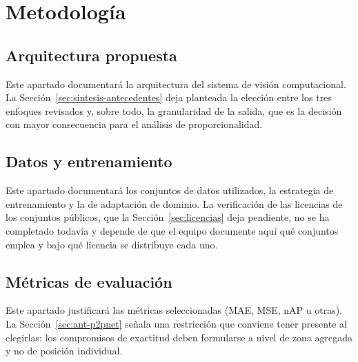 %
%
\section{Metodología}
\label{sec:metodologia}


\subsection{Arquitectura propuesta}
\label{sec:arquitectura}

Este apartado documentará la arquitectura del sistema de visión
computacional. La Sección~\ref{sec:sintesis-antecedentes} deja planteada
la elección entre los tres enfoques revisados y, sobre todo, la
granularidad de la salida, que es la decisión con mayor consecuencia para
el análisis de proporcionalidad.

\subsection{Datos y entrenamiento}
\label{sec:datos-entrenamiento}

Este apartado documentará los conjuntos de datos utilizados, la
estrategia de entrenamiento y la de adaptación de dominio. La
verificación de las licencias de los conjuntos públicos, que la
Sección~\ref{sec:licencias} deja pendiente, no se ha completado todavía
y depende de que el equipo documente aquí qué conjuntos emplea y bajo qué
licencia se distribuye cada uno.

\subsection{Métricas de evaluación}
\label{sec:metricas}

Este apartado justificará las métricas seleccionadas (MAE, MSE, nAP u
otras). La Sección~\ref{sec:ant-p2pnet} señala una restricción que
conviene tener presente al elegirlas: los compromisos de exactitud deben
formularse a nivel de zona agregada y no de posición individual.

